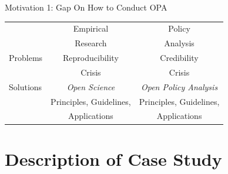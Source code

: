 \documentclass{beamer}
\begin{document}
\begin{frame}[noframenumbering]{Motivation 1: Gap On How to Conduct OPA}
\begin{table}[ht]
\centering
\begin{tabular}[t]{|l|c|c|}
\hline
& Empirical  & Policy \\
& Research & Analysis \\

\hline
Problems & Reproducibility  &  Credibility \\
				 &  Crisis & Crisis \\
\hline
Solutions &  \textit{Open Science}&    \textit{Open Policy Analysis} \\
 & Principles, Guidelines,  &   Principles, Guidelines,\\
 & Applications &   Applications\\

\hline
\end{tabular}
\end{table}%
\end{frame}
 

\section[Case Study]{Description of Case Study}
\end{document}
